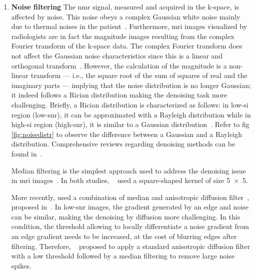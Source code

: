 \begin{enumerate}[leftmargin=*]
\item[] \textbf{Noise filtering}
The \ac{nmr} signal, measured and acquired in the k-space, is affected by noise.
This noise obeys a complex Gaussian white noise mainly due to thermal noises in
the patient~\cite{Nowak1999}.
Furthermore, \ac{mri} images visualized by radiologists are in fact the
magnitude images resulting from the complex Fourier transform of the k-space
data.
The complex Fourier transform does not affect the Gaussian noise
characteristics since this is a linear and orthogonal
transform~\cite{Nowak1999}.
However, the calculation of the magnitude is a non-linear transform --- i.e.,
the square root of the sum of squares of real and the imaginary parts ---
implying that the noise distribution is no longer Gaussian; it indeed follows a
Rician distribution making the denoising task more challenging.
Briefly, a Rician distribution is characterized as follows: in low-\ac{si}
region (low-\ac{snr}), it can be approximated with a Rayleigh distribution
while in high-\ac{si} region (high-\ac{snr}), it is similar to a Gaussian
distribution~\cite{Manjon2008}.
Refer to \acs{fig}\,\ref{fig:noisedistr} to observe the difference between a
Gaussian and a Rayleigh distribution.
Comprehensive reviews regarding denoising methods can be found
in~\cite{Buades2005,Mohan2014}.

Median filtering is the simplest approach used to address the denoising issue
in \ac{mri} images~\cite{Ozer2009,Ozer2010}.
In both studies, \citeauthor{Ozer2010}~\cite{Ozer2009,Ozer2010} used a
square-shaped kernel of size \SI[product-units=repeat]{5x5}{\px}.

More recently, \citeauthor{rampun2016quantitative} used a combination of median
and anisotropic diffusion
filter~\cite{rampun2015classifying,rampun2016computer,rampun2016computerb,rampun2016quantitative},
proposed in~\cite{ling2002smoothing}.
In low-\ac{snr} images, the gradient generated by an edge and noise can be
similar, making the denoising by diffusion more challenging.
In this condition, the threshold allowing to locally differentiate a noise
gradient from an edge gradient needs to be increased, at the cost of blurring
edges after filtering.
Therefore, \citeauthor{ling2002smoothing}~\cite{ling2002smoothing} proposed to
apply a standard anisotropic diffusion filter with a low threshold followed by
a median filtering to remove large noise spikes.




\end{enumerate}
